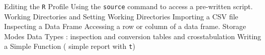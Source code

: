 
Editing the \texttt{R} Profile
Using the \texttt{source} command to access a pre-written script.
Working Directories and Setting Working Directories
Importing a CSV file
Inspecting a Data Frame
Accessing a row or column of a data frame.
Storage Modes
Data Types : inspection and conversion
tables and crosstabulation
Writing a Simple Function ( simple report with \texttt{t})



